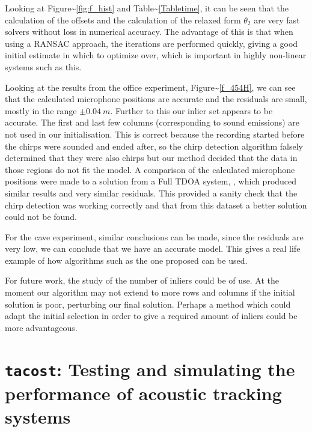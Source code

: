 \documentclass[
]{book}
\begin{document}
Looking at Figure\textasciitilde{}\ref{fig:f_hist} and Table\textasciitilde{}\ref{Tabletime}, it can be seen that the calculation of the offsets and the calculation of the relaxed form \(\theta_2\) are very fast solvers without loss in numerical accuracy. The advantage of this is that when using a RANSAC approach, the iterations are performed quickly, giving a good initial estimate in which to optimize over, which is important in highly
non-linear systems such as this.

Looking at the results from the office experiment, Figure\textasciitilde{}\ref{f_454H}, we can see that the calculated microphone positions are accurate and the residuals are small, mostly in the range \(\pm 0.04~m\). Further to this our inlier set appears to be accurate. The first and last few columns (corresponding to sound emissions) are not used in our initialisation. This is correct because the recording started before the chirps were sounded and ended after, so the chirp detection algorithm falsely determined that they were also chirps but our method decided that the data in those regions do not fit the model. A comparison of the calculated microphone positions were made to a solution from a Full TDOA system, \cite{kuang2013stratified}, which produced similar results and very similar residuals. This provided a sanity check that the chirp detection was working correctly and that from this dataset a better solution could not be found.

For the cave experiment, similar conclusions can be made, since the residuals are very low, we can conclude that we have an accurate model. This gives a real life example of how algorithms such as the one proposed can be used.

For future work, the study of the number of inliers could be of use. At the moment our algorithm may not extend to more rows and columns if the initial solution is poor, perturbing our final solution. Perhaps a method which could adapt the initial selection in order to give a required amount of inliers could be more advantageous.

\hypertarget{tacost-testing-and-simulating-the-performance-of-acoustic-tracking-systems}{%
\chapter{\texorpdfstring{\texttt{tacost}: Testing and simulating the performance of acoustic tracking systems}{tacost: Testing and simulating the performance of acoustic tracking systems}}\label{tacost-testing-and-simulating-the-performance-of-acoustic-tracking-systems}}
\end{document}
